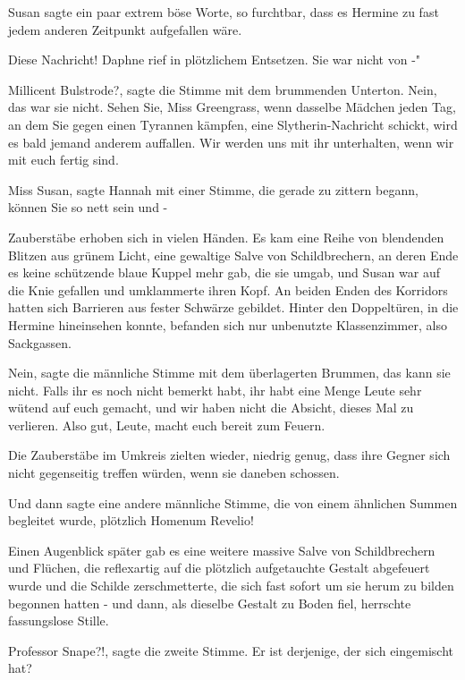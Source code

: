 Susan sagte ein paar extrem böse Worte, so furchtbar, dass es Hermine zu fast
jedem anderen Zeitpunkt aufgefallen wäre.

\glqq{}Diese Nachricht!\grqq{} Daphne rief in plötzlichem Entsetzen. \glqq{}Sie
war nicht von -"

\glqq{}Millicent Bulstrode?\grqq{}, sagte die Stimme mit dem brummenden Unterton.
\glqq{}Nein, das war sie nicht. Sehen Sie, Miss Greengrass, wenn dasselbe Mädchen
jeden Tag, an dem Sie gegen einen Tyrannen kämpfen, eine Slytherin-Nachricht
schickt, wird es bald jemand anderem auffallen. Wir werden uns mit ihr
unterhalten, wenn wir mit euch fertig sind.\grqq{}

\glqq{}Miss Susan\grqq{}, sagte Hannah mit einer Stimme, die gerade zu zittern
begann, \glqq{}können Sie so nett sein und -\grqq{}

Zauberstäbe erhoben sich in vielen Händen. Es kam eine Reihe von blendenden
Blitzen aus grünem Licht, eine gewaltige Salve von Schildbrechern, an deren Ende
es keine schützende blaue Kuppel mehr gab, die sie umgab, und Susan war auf die
Knie gefallen und umklammerte ihren Kopf. An beiden Enden des Korridors hatten
sich Barrieren aus fester Schwärze gebildet. Hinter den Doppeltüren, in die
Hermine hineinsehen konnte, befanden sich nur unbenutzte Klassenzimmer, also
Sackgassen.

\glqq{}Nein\grqq{}, sagte die männliche Stimme mit dem überlagerten Brummen,
\glqq{}das kann sie nicht. Falls ihr es noch nicht bemerkt habt, ihr habt eine
Menge Leute sehr wütend auf euch gemacht, und wir haben nicht die Absicht,
dieses Mal zu verlieren. Also gut, Leute, macht euch bereit zum Feuern.\grqq{}

Die Zauberstäbe im Umkreis zielten wieder, niedrig genug, dass ihre Gegner sich
nicht gegenseitig treffen würden, wenn sie daneben schossen.

Und dann sagte eine andere männliche Stimme, die von einem ähnlichen Summen
begleitet wurde, plötzlich \glqq{}Homenum Revelio!\grqq{}

Einen Augenblick später gab es eine weitere massive Salve von Schildbrechern und
Flüchen, die reflexartig auf die plötzlich aufgetauchte Gestalt abgefeuert wurde
und die Schilde zerschmetterte, die sich fast sofort um sie herum zu bilden
begonnen hatten - und dann, als dieselbe Gestalt zu Boden fiel, herrschte
fassungslose Stille.

\glqq{}Professor Snape?!\grqq{}, sagte die zweite Stimme. \glqq{}Er ist derjenige,
der sich eingemischt hat?\grqq{}

